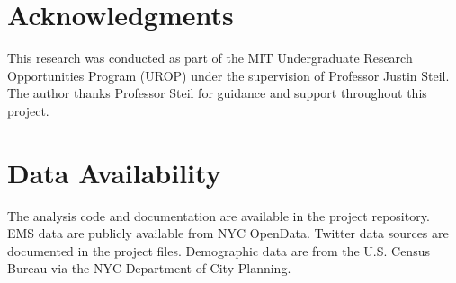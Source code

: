 \documentclass[11pt,a4paper]{article}
\begin{document}
\section*{Acknowledgments}

This research was conducted as part of the MIT Undergraduate Research Opportunities Program (UROP) under the supervision of Professor Justin Steil. The author thanks Professor Steil for guidance and support throughout this project.

\section*{Data Availability}

The analysis code and documentation are available in the project repository. EMS data are publicly available from NYC OpenData. Twitter data sources are documented in the project files. Demographic data are from the U.S. Census Bureau via the NYC Department of City Planning.
\end{document}
